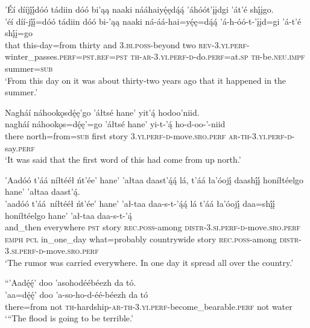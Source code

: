 \ea\label{ex:text6-11-5}
’Éí dííjį́į́dóó tádiin dóó bi’ąą naaki nááhaiyę́ędą́ą́ ’áhóót’įįdgi ’át’é shį́įgo.\\
\gll ’éí	díí-jį́į́=dóó	tádiin	dóó	bi-’ąą	naaki	ná-áá-hai=yę́ę=dą́ą́	’á-h-óó-t-’įįd=gi	’á-t’é	shį́į=go\\
     that	this-day=from	thirty	and	3.\textsc{bi}.\textsc{poss}-beyond	two	\textsc{rev}-3.\textsc{yi}.\textsc{perf}-winter\_passes.\textsc{perf}=\textsc{pst}.\textsc{ref}=\textsc{pst}	\textsc{th}-\textsc{ar}-3.\textsc{yi}.\textsc{perf}-\textsc{d}-do.\textsc{perf}=at.\textsc{sp}	\textsc{th}-be.\textsc{neu}.\textsc{impf}	summer=\textsc{sub}\\
\glt `From this day on it was about thirty-two years ago that it happened in the summer.'
\z

\ea\label{ex:text6-11-6}
Nagháí náhookǫsdę́ę’go ’áłtsé hane’ yit’ą́ hodoo’niid.\\
\gll nagháí	náhookǫs=dę́ę’=go	’áłtsé	hane’	yi-t-’ą́	ho-d-oo-’-niid\\
     there	north=from=\textsc{sub}	first	story	3.\textsc{yi}.\textsc{perf}-\textsc{d}-move.\textsc{sro}.\textsc{perf}	\textsc{ar}-\textsc{th}-3.\textsc{yi}.\textsc{perf}-\textsc{d}-say.\textsc{perf}\\
\glt `It was said that the first word of this had come from up north.'
\z

\ea\label{ex:text6-11-7}
’Aadóó t’áá níłtééł ńt’ée’ hane’ ’ałtaa daast’ą́ą́ lá, t’áá ła’óojį́ daashį́į́ honíłtéelgo hane’ ’ałtaa daast’ą́.\\
\gll ’aadóó	t’áá~{níłtééł}	ńt’ée’	hane’	’ał-taa	daa-s-t-’ą́ą́	lá	t’áá	ła’óojį́	daa=shį́į́	honíłtéelgo	hane’	’ał-taa	daa-s-t-’ą́\\
     and\_then	everywhere	\textsc{pst}	story	\textsc{rec}.\textsc{poss}-among	\textsc{distr}-3.\textsc{si}.\textsc{perf}-\textsc{d}-move.\textsc{sro}.\textsc{perf}	\textsc{emph}	\textsc{pcl}	in\_one\_day	what=probably	countrywide	story	\textsc{rec}.\textsc{poss}-among	\textsc{distr}-3.\textsc{si}.\textsc{perf}-\textsc{d}-move.\textsc{sro}.\textsc{perf}\\
\glt `The rumor was carried everywhere. In one day it spread all over the country.'
\z

\ea\label{ex:text6-11-8}{``}’Aadę́ę́’ doo ’asohodéébéezh da tó.\\
\gll ’aa=dę́ę́’	doo	’a-so-ho-d-éé-béezh	da	tó\\
     there=from	not	\textsc{th}-hardship-\textsc{ar}-\textsc{th}-3.\textsc{yi}.\textsc{perf}-become\_bearable.\textsc{perf}	not	water\\
\glt `“The flood is going to be terrible.'
\z

